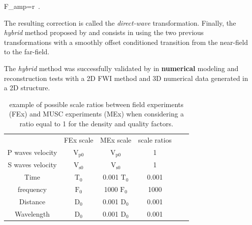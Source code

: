 \documentclass[extra,mreferee]{gji}
\newenvironment{greennote}{\par\color{OliveGreen}}{\par}
\begin{document}
\begin{greennote}
\equation
\label{eq:direct-wave}
F_{amp}=r\ .
\endequation

The resulting correction is called the \textit{direct-wave} transformation. Finally, the \textit{hybrid} method proposed by \cite{Forbriger_LSS_2014} and \cite{schafer2014lss} consists in using the two previous transformations with a smoothly offset conditioned transition from the near-field to the far-field.

The \textit{hybrid} method was successfully validated by \cite{schafer2014lss} in \textbf{numerical} modeling and reconstruction tests with a 2D FWI method and 3D numerical data generated in a 2D structure. 
\end{greennote}

\clearpage
\newpage

\begin{table}
\centering
\caption{ example of possible scale ratios between field experiments (FEx) and MUSC experiments (MEx) when considering a ratio equal to 1 for the density and quality factors.}
\begin{tabular}{cccccc}
\quad & FEx scale & MEx scale & scale ratios \\
P waves velocity & $\mathrm{V_{p 0}}$ & $\mathrm{V_{p 0}}$ & 1 \\
S waves velocity & $\mathrm{V_{s 0}}$ & $\mathrm{V_{s 0}}$ & 1 \\
Time & $\mathrm{T_{0}}$ & 0.001 $\mathrm{T_{0}}$ & 0.001 \\
frequency & $\mathrm{F_{0}}$ & 1000 $\mathrm{F_{0}}$ & 1000 \\
Distance & $\mathrm{D_{0}}$ & 0.001 $\mathrm{D_{0}}$ & 0.001 \\
Wavelength & $\mathrm{D_{0}}$ & 0.001 $\mathrm{D_{0}}$ & 0.001 \\
\end{tabular}
\label{epoxy-resin}
\end{table}

\clearpage
\newpage
\end{document}
